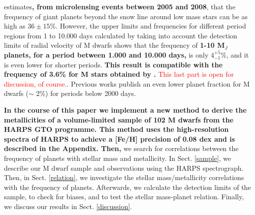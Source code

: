 \documentclass[structabstract]{aa}
\begin{document}
\citet{Gould-2010} estimates\textbf{, from microlensing events between 2005 and 2008}, that the frequency of giant planets beyond the snow line around low mass stars can be as high as $36\pm15\%$. However, the upper limits and frequencies for different period regions from 1 to 10.000 days calculated by \citet{Bonfils-2011} taking into account the detection limits of radial velocity of M dwarfs shows that the frequency of \textbf{1-10 M$_{J}$ planets, for a period between 1.000 and 10.000 days,} is only $4^{+5}_{-1} \%$, and it is even lower for shorter periods. \textbf{This result is compatible with the frequency of 3.6\% for M stars obtained by \citet{Johnson-2010}.}  \textcolor{red}{This last part is open for discussion, of course.}. Previous works \citep{Butler-2006,Johnson-2007,Cumming-2008} publish an even lower planet fraction for M dwarfs ($\sim$ 2\%) for periods below 2000 days. 



\textbf{In the course of this paper we implement a new method to derive the metallicities of \textbf{a volume-limited} sample of 102 M dwarfs from the HARPS GTO programme. This method uses the high-resolution spectra of HARPS to achieve a [Fe/H] precision of 0.08 dex and is described in the Appendix. Then,} we
search for correlations between the frequency of planets with stellar mass and metallicity. In Sect. \ref{sample}, we describe our M dwarf sample and observations using the HARPS spectrograph. Then, in Sect. \ref{relation}, we investigate the stellar mass/metallicity correlations with the frequency of planets. Afterwards, we calculate the detection limits of the sample, to check for biases, and to test the stellar mass-planet relation.
Finally, we discuss our results in Sect. \ref{discussion}.








\end{document}
